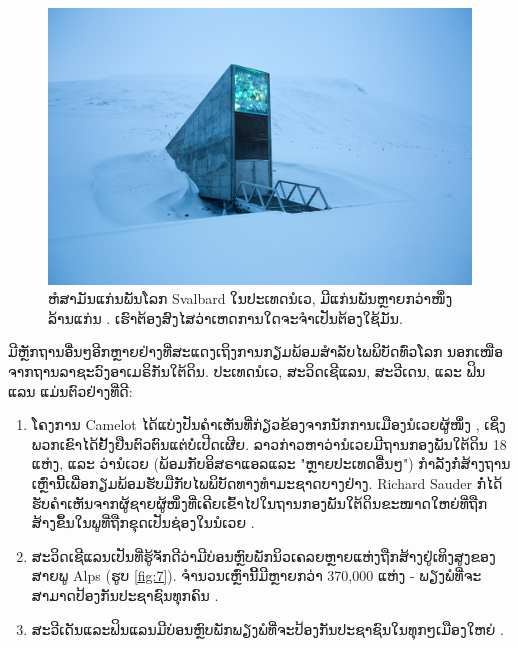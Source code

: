 \documentclass[10pt,twocolumn,letterpaper]{article}
\begin{document}
\begin{figure}[t]
\begin{center}
   \includegraphics[width=1\linewidth]{svalbard.jpg}
\end{center}
   \caption{ຫໍສາມັນແກ່ນພັນໂລກ Svalbard ໃນປະເທດນໍເວ, ມີແກ່ນພັນຫຼາຍກວ່າໜຶ່ງລ້ານແກ່ນ \cite{24}. ເຮົາຕ້ອງສົງໄສວ່າເຫດການໃດຈະຈຳເປັນຕ້ອງໃຊ້ມັນ.}
\label{fig:8}
\label{fig:onecol}
\end{figure}

ມີຫຼັກຖານອື່ນໆອີກຫຼາຍຢ່າງທີ່ສະແດງເຖິງການກຽມພ້ອມສຳລັບໄພພິບັດທົ່ວໂລກ ນອກເໜືອຈາກຖານລາຊະວົງອາເມຣິກັນໃຕ້ດິນ. ປະເທດນໍເວ, ສະວິດເຊີແລນ, ສະວີເດນ, ແລະ ຟິນແລນ ແມ່ນຕົວຢ່າງທີ່ດີ:

\begin{flushleft}
\begin{enumerate}
    \item ໂຄງການ Camelot ໄດ້ແບ່ງປັນຄຳເຫັນທີ່ກ່ຽວຂ້ອງຈາກນັກການເມືອງນໍເວຍຜູ້ໜຶ່ງ \cite{25,26}, ເຊິ່ງພວກເຂົາໄດ້ຢັ້ງຢືນຕົວຕົນແຕ່ບໍ່ເປີດເຜີຍ. ລາວກ່າວຫາວ່ານໍເວຍມີຖານກອງພັນໃຕ້ດິນ 18 ແຫ່ງ, ແລະ ວ່ານໍເວຍ (ພ້ອມກັບອິສຣາແອລແລະ "ຫຼາຍປະເທດອື່ນໆ") ກຳລັງກໍ່ສ້າງຖານເຫຼົ່ານີ້ເພື່ອກຽມພ້ອມຮັບມືກັບໄພພິບັດທາງທຳມະຊາດບາງຢ່າງ. Richard Sauder ກໍ່ໄດ້ຮັບຄຳເຫັນຈາກຜູ້ຊາຍຜູ້ໜຶ່ງທີ່ເຄີຍເຂົ້າໄປໃນຖານກອງພັນໃຕ້ດິນຂະໜາດໃຫຍ່ທີ່ຖືກສ້າງຂຶ້ນໃນພູທີ່ຖືກຂຸດເປັນຊ່ອງໃນນໍເວຍ \cite{22}.
    \item ສະວິດເຊີແລນເປັນທີ່ຮູ້ຈັກດີວ່າມີບ່ອນຫຼົບພັກນິວເຄລຍຫຼາຍແຫ່ງຖືກສ້າງຢູ່ເທິງສູງຂອງສາຍພູ Alps (ຮູບ \ref{fig:7}). ຈຳນວນເຫຼົ່ານີ້ມີຫຼາຍກວ່າ 370,000 ແຫ່ງ - ພຽງພໍທີ່ຈະສາມາດປ້ອງກັນປະຊາຊົນທຸກຄົນ \cite{27}.
    \item ສະວີເດັນແລະຟິນແລນມີບ່ອນຫຼົບພັກພຽງພໍທີ່ຈະປ້ອງກັນປະຊາຊົນໃນທຸກໆເມືອງໃຫຍ່ \cite{27}. 
\end{enumerate}
\end{flushleft}
\end{document}
